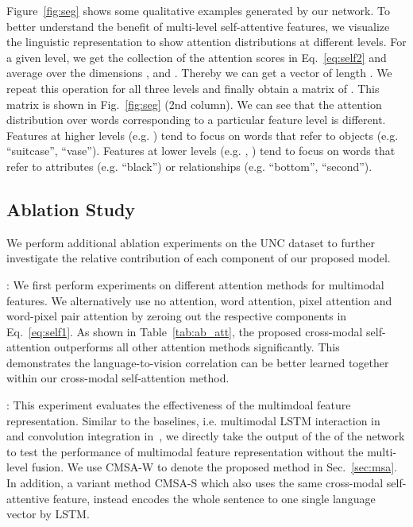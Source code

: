 \documentclass[10pt,twocolumn,letterpaper]{article}
\begin{document}
 Figure~\ref{fig:seg} shows some qualitative examples generated by our network. To better understand the benefit of multi-level self-attentive features, we visualize the linguistic representation to show attention distributions at different levels. For a given level, we get the collection of the attention scores  in Eq.~\ref{eq:self2} and average over the dimensions ,  and . Thereby we can get a vector of length . We repeat this operation for all three levels and finally obtain a matrix of . This matrix is shown in Fig.~\ref{fig:seg} (2nd column). We can see that the attention distribution over words corresponding to a particular feature level is different. Features at higher levels (e.g. ) tend to focus on words that refer to objects (e.g. ``suitcase'', ``vase''). Features at lower levels (e.g. , ) tend to focus on words that refer to attributes (e.g. ``black'') or relationships (e.g. ``bottom'', ``second'').



\subsection{Ablation Study}\label{sec:ab}



We perform additional ablation experiments on the UNC dataset to further investigate the relative contribution of each component of our proposed model.

: We  first perform experiments on different attention methods for multimodal features. We alternatively use no attention, word attention, pixel attention and word-pixel pair attention by zeroing out the respective components in Eq.~\ref{eq:self1}. As shown in Table~\ref{tab:ab_att}, the proposed cross-modal self-attention outperforms all other attention methods significantly. This demonstrates the language-to-vision correlation can be better learned together within our cross-modal self-attention method.


: This experiment evaluates the effectiveness of the multimdoal feature representation. Similar to the baselines, i.e. multimodal LSTM interaction in~\cite{liu2017recurrent} and convolution integration in~\cite{li2018referring}, we directly take the output of the  of the network to test the performance of multimodal feature representation without the multi-level fusion. We use CMSA-W to denote the proposed method in Sec.~\ref{sec:msa}. In addition, a variant method CMSA-S which also uses the same cross-modal self-attentive feature, instead encodes the whole sentence to one single language vector by LSTM.
\end{document}
